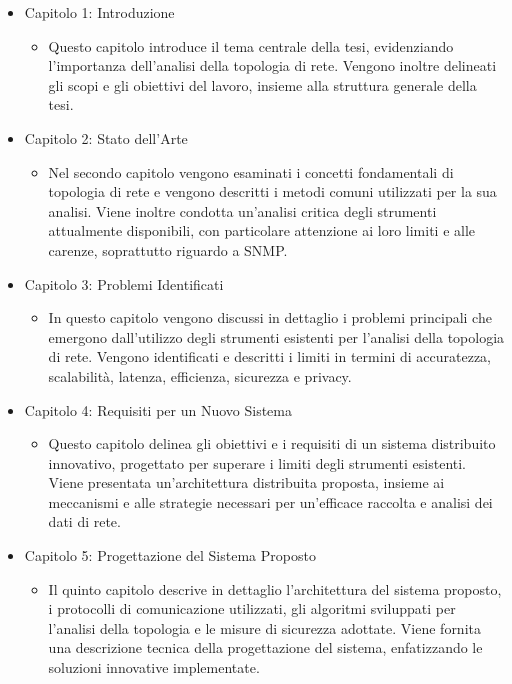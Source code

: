 \documentclass[target=bach,aauheader=,style=]{thud}
\begin{document}
\begin{itemize}
  \item Capitolo 1: Introduzione
  \begin{itemize}
    \item Questo capitolo introduce il tema centrale della tesi, evidenziando l'importanza dell'analisi della topologia di rete. Vengono inoltre delineati gli scopi e gli obiettivi del lavoro, insieme alla struttura generale della tesi.
  \end{itemize}

  \item Capitolo 2: Stato dell'Arte
    \begin{itemize}
      \item Nel secondo capitolo vengono esaminati i concetti fondamentali di topologia di rete e vengono descritti i metodi comuni utilizzati per la sua analisi. Viene inoltre condotta un'analisi critica degli strumenti attualmente disponibili, con particolare attenzione ai loro limiti e alle carenze, soprattutto riguardo a SNMP.
    \end{itemize}


  \item Capitolo 3: Problemi Identificati
    \begin{itemize}
      \item In questo capitolo vengono discussi in dettaglio i problemi principali che emergono dall'utilizzo degli strumenti esistenti per l'analisi della topologia di rete. Vengono identificati e descritti i limiti in termini di accuratezza, scalabilità, latenza, efficienza, sicurezza e privacy.
    \end{itemize}


  \item    Capitolo 4: Requisiti per un Nuovo Sistema
    \begin{itemize}
      \item Questo capitolo delinea gli obiettivi e i requisiti di un sistema distribuito innovativo, progettato per superare i limiti degli strumenti esistenti. Viene presentata un'architettura distribuita proposta, insieme ai meccanismi e alle strategie necessari per un'efficace raccolta e analisi dei dati di rete.
    \end{itemize}

  \item Capitolo 5: Progettazione del Sistema Proposto
    \begin{itemize}
      \item Il quinto capitolo descrive in dettaglio l'architettura del sistema proposto, i protocolli di comunicazione utilizzati, gli algoritmi sviluppati per l'analisi della topologia e le misure di sicurezza adottate. Viene fornita una descrizione tecnica della progettazione del sistema, enfatizzando le soluzioni innovative implementate.
    \end{itemize}


\end{itemize}
\end{document}
